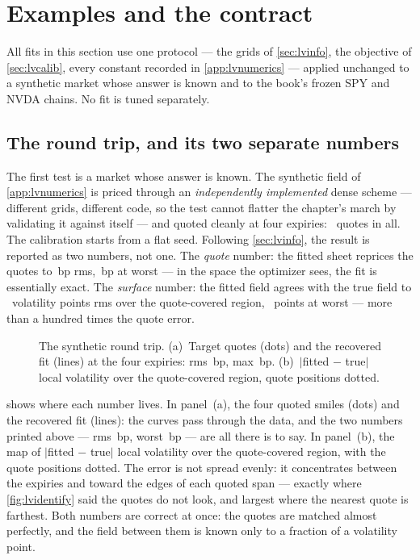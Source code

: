 \section{Examples and the contract}
\label{sec:lvexamples}

All fits in this section use one protocol --- the grids of
\cref{sec:lvinfo}, the objective of \cref{sec:lvcalib}, every constant
recorded in \cref{app:lvnumerics} --- applied unchanged to a synthetic
market whose answer is known and to the book's frozen SPY and NVDA
chains.  No fit is tuned separately.

\subsection{The round trip, and its two separate numbers}

The first test is a market whose answer is known.  The synthetic field
of \cref{app:lvnumerics} is priced through an \emph{independently
implemented} dense scheme --- different grids, different code, so the
test cannot flatter the chapter's march by validating it against
itself --- and quoted cleanly at four expiries: \MacLvRtNQuotes\
quotes in all.  The calibration starts from a flat seed.  Following
\cref{sec:lvinfo}, the result is reported as two numbers, not one.
The \emph{quote} number: the fitted sheet reprices the quotes to
\MacLvRtRmsErrBp\,bp rms, \MacLvRtMaxErrBp\,bp at worst --- in the
space the optimizer sees, the fit is essentially exact.  The
\emph{surface} number: the fitted field agrees with the true field to
\MacLvRtSurfRmsPts\ volatility points rms over the quote-covered
region, \MacLvRtSurfMaxPts\ points at worst --- more than a hundred
times the quote error.

\begin{figure}[htbp]
\centering
{}
\caption{The synthetic round trip.  (a)~Target quotes (dots) and the
recovered fit (lines) at the four expiries: rms \MacLvRtRmsErrBp\,bp,
max \MacLvRtMaxErrBp\,bp.  (b)~$|$fitted $-$ true$|$ local volatility
over the quote-covered region, quote positions dotted.}
\label{fig:lvrecovery}
\end{figure}

 shows where each number lives.  In panel~(a),
the four quoted smiles (dots) and the recovered fit (lines): the
curves pass through the data, and the two numbers printed above ---
rms \MacLvRtRmsErrBp\,bp, worst \MacLvRtMaxErrBp\,bp --- are all
there is to say.  In panel~(b), the map of $|$fitted $-$ true$|$ local
volatility over the quote-covered region, with the quote positions
dotted.  The error is not spread evenly: it concentrates between the
expiries and toward the edges of each quoted span --- exactly where
\cref{fig:lvidentify} said the quotes do not look, and largest where
the nearest quote is farthest.  Both numbers are correct at once: the
quotes are matched almost perfectly, and the field between them is
known only to a fraction of a volatility point.

